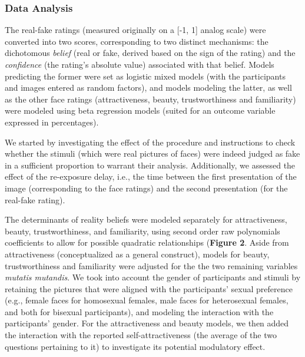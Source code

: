 \documentclass[
  man,floatsintext]{apa6}
\begin{document}
\hypertarget{data-analysis}{%
\subsubsection{Data Analysis}\label{data-analysis}}

The real-fake ratings (measured originally on a {[}-1, 1{]} analog scale) were converted into two scores, corresponding to two distinct mechanisms: the dichotomous \emph{belief} (real or fake, derived based on the sign of the rating) and the \emph{confidence} (the rating's absolute value) associated with that belief. Models predicting the former were set as logistic mixed models (with the participants and images entered as random factors), and models modeling the latter, as well as the other face ratings (attractiveness, beauty, trustworthiness and familiarity) were modeled using beta regression models (suited for an outcome variable expressed in percentages).

We started by investigating the effect of the procedure and instructions to check whether the stimuli (which were real pictures of faces) were indeed judged as fake in a sufficient proportion to warrant their analysis. Additionally, we assessed the effect of the re-exposure delay, i.e., the time between the first presentation of the image (corresponding to the face ratings) and the second presentation (for the real-fake rating).

The determinants of reality beliefs were modeled separately for attractiveness, beauty, trustworthiness, and familiarity, using second order raw polynomials coefficients to allow for possible quadratic relationships (\textbf{Figure 2}. Aside from attractiveness (conceptualized as a general construct), models for beauty, trustworthiness and familiarity were adjusted for the the two remaining variables \emph{mutatis mutandis}. We took into account the gender of participants and stimuli by retaining the pictures that were aligned with the participants' sexual preference (e.g., female faces for homosexual females, male faces for heterosexual females, and both for bisexual participants), and modeling the interaction with the participants' gender. For the attractiveness and beauty models, we then added the interaction with the reported self-attractiveness (the average of the two questions pertaining to it) to investigate its potential modulatory effect.
\end{document}
